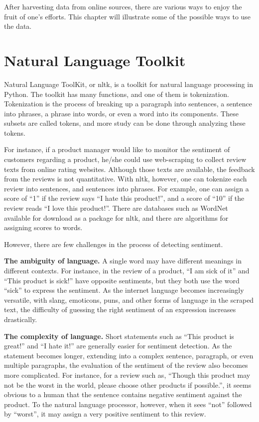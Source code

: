 \documentclass[12pt]{report}
\begin{document}
After harvesting data from online sources, there are various ways to enjoy the fruit of one's efforts. This chapter will illustrate some of the possible ways to use the data.

\section{Natural Language Toolkit}

Natural Language ToolKit, or \gls{nltk}, is a toolkit for natural language processing in Python. The toolkit has many functions, and one of them is tokenization. Tokenization is the process of breaking up a paragraph into sentences, a sentence into phrases, a phrase into words, or even a word into its components. These subsets are called tokens, and more study can be done through analyzing these tokens.

For instance, if a product manager would like to monitor the sentiment of customers regarding a product, he/she could use web-scraping to collect review texts from online rating websites. Although those texts are available, the feedback from the reviews is not quantitative. With \gls{nltk}, however, one can tokenize each review into sentences, and sentences into phrases. For example, one can assign a score of ``1'' if the review says ``I hate this product!'', and a score of ``10'' if the review reads ``I love this product!''. There are databases such as WordNet available for download as a package for \gls{nltk}, and there are algorithms for assigning scores to words.

However, there are few challenges in the process of detecting sentiment. 

\textbf{The ambiguity of language.} A single word may have different meanings in different contexts. For instance, in the review of a product, ``I am sick of it'' and ``This product is sick!'' have opposite sentiments, but they both use the word ``sick'' to express the sentiment. As the internet language becomes increasingly versatile, with slang, emoticons, puns, and other forms of language in the scraped text, the difficulty of guessing the right sentiment of an expression increases drastically.

\textbf{The complexity of language.} Short statements such as ``This product is great!'' and ``I hate it!'' are generally easier for sentiment detection. As the statement becomes longer, extending into a complex sentence, paragraph, or even multiple paragraphs, the evaluation of the sentiment of the review also becomes more complicated. For instance, for a review such as, ``Though this product may not be the worst in the world, please choose other products if possible.'', it seems obvious to a human that the sentence contains negative sentiment against the product. To the natural language processor, however, when it sees ``not'' followed by ``worst'', it may assign a very positive sentiment to this review.
\end{document}
